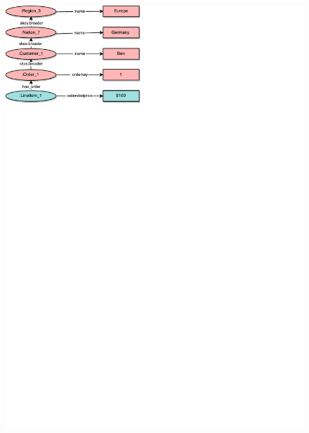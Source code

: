 \begin{frame}{\patsec}
\framesubtitle{\snowpat}
    \begin{figure}
        \includegraphics[trim=0 648 325 0,clip,width=1\textheight]{images/snowflakepattern.pdf}
    \end{figure}
\end{frame}

